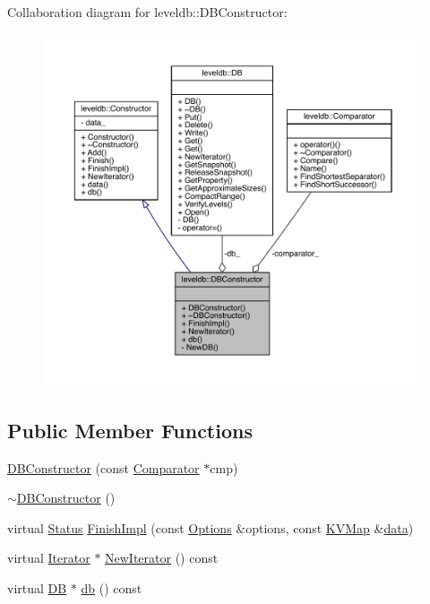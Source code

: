 Collaboration diagram for leveldb\+:\+:D\+B\+Constructor\+:\nopagebreak
\begin{figure}[H]
\begin{center}
\leavevmode
\includegraphics[width=350pt]{classleveldb_1_1_d_b_constructor__coll__graph}
\end{center}
\end{figure}
\subsection*{Public Member Functions}
\begin{DoxyCompactItemize}
\item 
\hyperlink{classleveldb_1_1_d_b_constructor_ae27ecdd7732629b08c25a63f82dfd4a9}{D\+B\+Constructor} (const \hyperlink{structleveldb_1_1_comparator}{Comparator} $\ast$cmp)
\item 
\hyperlink{classleveldb_1_1_d_b_constructor_a370a9584eadd852b375267f69fde241c}{$\sim$\+D\+B\+Constructor} ()
\item 
virtual \hyperlink{classleveldb_1_1_status}{Status} \hyperlink{classleveldb_1_1_d_b_constructor_a554d8e348d9135ff72a43a03c647c261}{Finish\+Impl} (const \hyperlink{structleveldb_1_1_options}{Options} \&options, const \hyperlink{namespaceleveldb_aac1e50450147be263e08252c6700f7a7}{K\+V\+Map} \&\hyperlink{classleveldb_1_1_constructor_a55a0363200d6e86d8beb3b15b75e3824}{data})
\item 
virtual \hyperlink{classleveldb_1_1_iterator}{Iterator} $\ast$ \hyperlink{classleveldb_1_1_d_b_constructor_a51936c1c2cb31fe26f5fb2a237cfdeec}{New\+Iterator} () const 
\item 
virtual \hyperlink{classleveldb_1_1_d_b}{D\+B} $\ast$ \hyperlink{classleveldb_1_1_d_b_constructor_a2bec14f01bb0fc459e0a09a70f06210d}{db} () const 
\end{DoxyCompactItemize}
